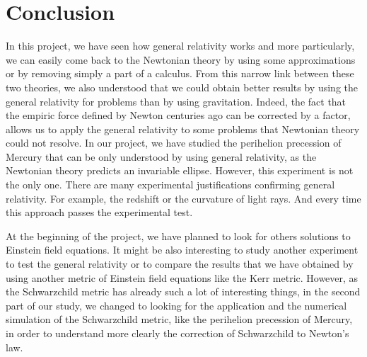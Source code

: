 \section{Conclusion}

In this project, we have seen how general relativity works and more particularly, we can
easily come back to the Newtonian theory by using some approximations or by removing simply
a part of a calculus. From this narrow link between these two theories, we also understood
that we could obtain better results by using the general relativity for problems than by
using gravitation.
Indeed, the fact that the empiric force defined by Newton centuries ago can be corrected by
a factor, allows us to apply the general relativity to some problems that Newtonian theory
could not resolve.
In our project, we have studied the perihelion precession of Mercury that can be only
understood by using general relativity, as the Newtonian theory predicts an invariable
ellipse.
However, this experiment is not the only one. There are many experimental justifications
confirming general relativity. For example, the redshift or the curvature of light rays.
And every time this approach passes the experimental test.

At the beginning of the project, we have planned to look for others solutions to Einstein
field equations. It might be also interesting to study another experiment to test the
general relativity or to compare the results that we have obtained by using another metric
of Einstein field equations like the Kerr metric. However, as the Schwarzchild metric has
already such a lot of interesting things, in the second part of our study, we changed to
looking for the application and the numerical simulation of the Schwarzchild metric, like
the perihelion precession of Mercury, in order to understand more clearly the correction
of Schwarzchild to Newton’s law. 
